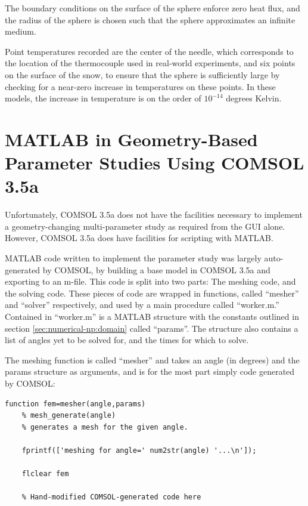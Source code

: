 The boundary conditions on the surface of the sphere enforce zero heat flux,
and the radius of the sphere is chosen such that the sphere approximates an
infinite medium.

Point temperatures recorded are the center of the needle, which corresponds to
the location of the thermocouple used in real-world experiments, and six points
on the surface of the snow, to ensure that the sphere is sufficiently large by
checking for a near-zero increase in temperatures on these points. In these
models, the increase in temperature is on the order of \(10^{-14}\) degrees
Kelvin.

\section{MATLAB in Geometry-Based Parameter Studies Using COMSOL 3.5a}
\label{sec:numerical-np:matlab}

Unfortunately, COMSOL 3.5a does not have the facilities necessary to implement a
geometry-changing multi-parameter study as required from the GUI alone. However,
COMSOL 3.5a does have facilities for scripting with MATLAB.

MATLAB code written to implement the parameter study was largely auto-generated
by COMSOL, by building a base model in COMSOL 3.5a and exporting to an m-file.
This code is split into two parts: The meshing code, and the solving code.
These pieces of code are wrapped in functions, called ``mesher'' and ``solver''
respectively, and used by a main procedure called ``worker.m.'' Contained in
``worker.m'' is a MATLAB structure with the constants outlined in section
\ref{sec:numerical-np:domain} called ``params''. The structure also contains a
list of angles yet to be solved for, and the times for which to solve.

The meshing function is called ``mesher'' and takes an angle
(in degrees) and the params structure as arguments, and is for the most part
simply code generated by COMSOL:

\small
\begin{verbatim}
function fem=mesher(angle,params)
    % mesh_generate(angle)
    % generates a mesh for the given angle. 

    fprintf(['meshing for angle=' num2str(angle) '...\n']);

    flclear fem

    % Hand-modified COMSOL-generated code here
\end{verbatim}
\normalsize

